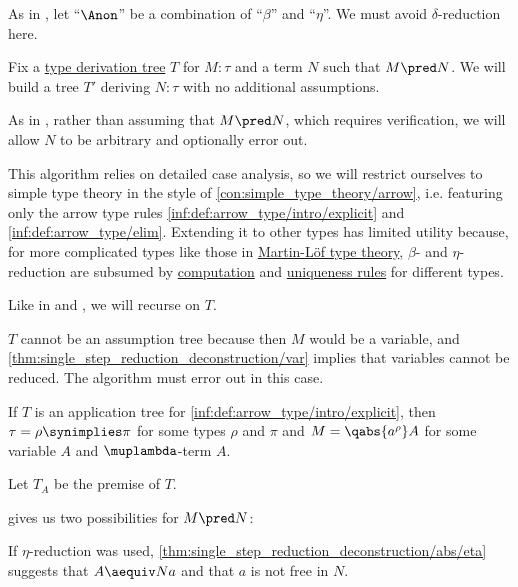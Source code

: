 \begin{algorithm}\label{alg:simply_typed_reduction}
  As in , let \enquote{\( {\Anon} \)} be a combination of \enquote{\( \beta \)} and \enquote{\( \eta \)}. We must avoid \( \delta \)-reduction here.

  Fix a \hyperref[def:type_derivation_tree]{type derivation tree} \( T \) for \( M: \tau \) and a term \( N \) such that \( M \pred N \). We will build a tree \( T' \) deriving \( N: \tau \) with no additional assumptions.

  As in , rather than assuming that \( M \pred N \), which requires verification, we will allow \( N \) to be arbitrary and optionally error out.

  This algorithm relies on detailed case analysis, so we will restrict ourselves to simple type theory in the style of \cref{con:simple_type_theory/arrow}, i.e. featuring only the arrow type rules \ref{inf:def:arrow_type/intro/explicit} and \ref{inf:def:arrow_type/elim}. Extending it to other types has limited utility because, for more complicated types like those in \hyperref[def:martin_lof_type_theory]{Martin-L\"of type theory}, \( \beta \)- and \( \eta \)-reduction are subsumed by \hyperref[rem:type_theory_rule_classification/equality/comp]{computation} and \hyperref[rem:type_theory_rule_classification/equality/uniq]{uniqueness rules} for different types.

  Like in  and , we will recurse on \( T \).

  \begin{thmenum}
     \( T \) cannot be an assumption tree because then \( M \) would be a variable, and \cref{thm:single_step_reduction_deconstruction/var} implies that variables cannot be reduced. The algorithm must error out in this case.

     If \( T \) is an application tree for \ref{inf:def:arrow_type/intro/explicit}, then \( \tau = \rho \synimplies \pi \) for some types \( \rho \) and \( \pi \) and \( M = \qabs {a^\rho} A \) for some variable \( A \) and \( \muplambda \)-term \( A \).

    Let \( T_A \) be the premise of \( T \).

     gives us two possibilities for \( M \pred N \):
    \begin{thmenum}
       If \( \eta \)-reduction was used, \cref{thm:single_step_reduction_deconstruction/abs/eta} suggests that \( A \aequiv Na \) and that \( a \) is not free in \( N \).


\end{thmenum}
\end{thmenum}
\end{algorithm}
